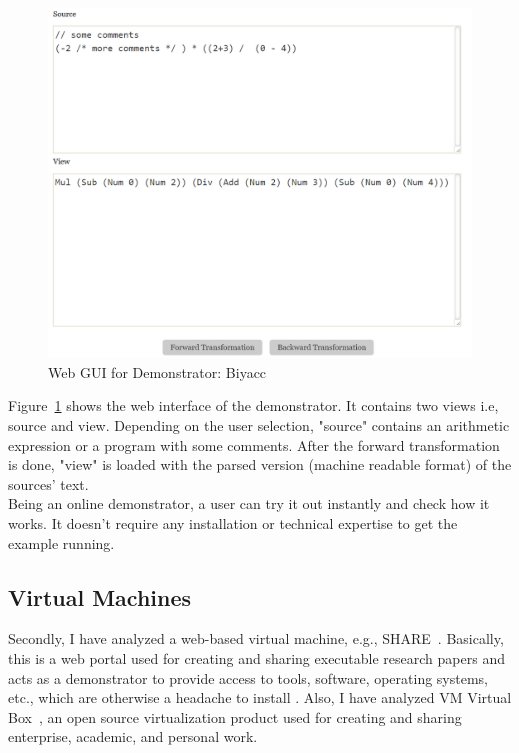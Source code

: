 \begin{figure}
	\includegraphics[width=1\textwidth]{figures/Biyacc}
	\caption{Web GUI for Demonstrator: Biyacc}
	\label{fig:WebGUI_Biyacc}
\end{figure}

Figure~\ref{fig:WebGUI_Biyacc} shows the web interface of the demonstrator. It contains two views i.e, source and view. Depending on the user selection, "source" contains an arithmetic expression or a program with some comments. After the forward transformation is done, "view" is loaded with the parsed version (machine readable format) of the sources' text.\\  
Being an online demonstrator, a user can try it out instantly and check how it works. It doesn't require any installation or technical expertise to get the example running.

\subsection{Virtual Machines}\label{subsec:virtualmachines}
Secondly, I have analyzed a web-based virtual machine, e.g., SHARE~\cite{share}. Basically, this is a web portal used for creating and sharing executable research papers and acts as a demonstrator to provide access to tools, software, operating systems, etc., which are otherwise a headache to install \cite{share}. Also, I have analyzed VM Virtual Box~\cite{virtualbox}, an open source virtualization product used for creating and sharing enterprise, academic, and personal work. 

